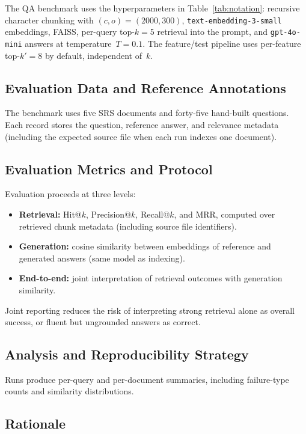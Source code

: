 \documentclass[conference]{IEEEtran}
\begin{document}
The QA benchmark uses the hyperparameters in Table~\ref{tab:notation}: recursive character chunking with $(c,o){=}(2000,300)$, \texttt{text-embedding-3-small} embeddings, FAISS, per-query top-$k{=}5$ retrieval into the prompt, and \texttt{gpt-4o-mini} answers at temperature~$T{=}0.1$. The feature/test pipeline uses per-feature top-$k'{=}8$ by default, independent of~$k$.

\subsection{Evaluation Data and Reference Annotations}

The benchmark uses five SRS documents and forty-five hand-built questions. Each record stores the question, reference answer, and relevance metadata (including the expected source file when each run indexes one document).

\subsection{Evaluation Metrics and Protocol}

Evaluation proceeds at three levels:

\begin{itemize}
    \item \textbf{Retrieval:} Hit@$k$, Precision@$k$, Recall@$k$, and MRR, computed over retrieved chunk metadata (including source file identifiers).
    \item \textbf{Generation:} cosine similarity between embeddings of reference and generated answers (same model as indexing).
    \item \textbf{End-to-end:} joint interpretation of retrieval outcomes with generation similarity.
\end{itemize}

Joint reporting reduces the risk of interpreting strong retrieval alone as overall success, or fluent but ungrounded answers as correct.

\subsection{Analysis and Reproducibility Strategy}

Runs produce per-query and per-document summaries, including failure-type counts and similarity distributions.

\subsection{Rationale}
\end{document}
